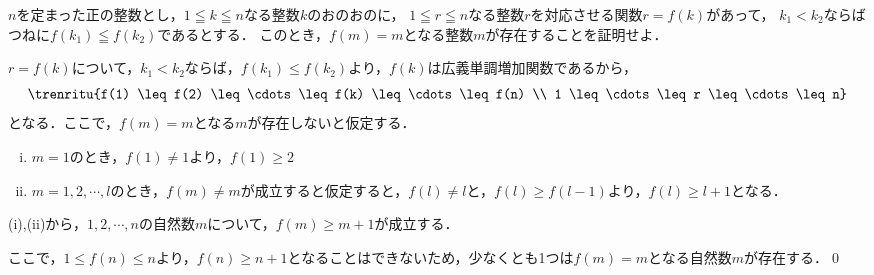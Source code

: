 \begin{problem}
$n$を定まった正の整数とし，$1 \leqq k \leqq n$なる整数$k$のおのおのに，
$1 \leqq r \leqq n$なる整数$r$を対応させる関数$r=f(k)$があって，
$k_1<k_2$ならばつねに$f(k_1) \leqq f(k_2)$であるとする．
このとき，$f(m)=m$となる整数$m$が存在することを証明せよ．
\end{problem}

$r = f(k)$について，$k_1 < k_2$ならば，$f(k_1) \leq f(k_2)$より，$f(k)$は広義単調増加関数であるから，
\[\trenritu{f(1) \leq f(2) \leq \cdots \leq f(k) \leq \cdots \leq f(n) \\ 1 \leq \cdots \leq r \leq \cdots \leq n}\]
となる．ここで，$f(m) = m$となる$m$が存在しないと仮定する．

\begin{enumerate}[(i)]
  \item $m = 1$のとき，$f(1) \neq 1$より，$f(1) \geq 2$
  \item $m = 1,2,\cdots,l$のとき，$f(m) \neq m$が成立すると仮定すると，$f(l) \neq l$と，$f(l)\geq f(l-1)$より，$f(l) \geq l+1$となる．
\end{enumerate}

(i),(ii)から，$1, 2, \cdots ,n$の自然数$m$について，$f(m) \geq m+1$が成立する．

ここで，$1 \leq f(n) \leq n$より，$f(n) \geq n+1$となることはできないため，少なくとも1つは$f(m) = m$となる自然数$m$が存在する．\qed

